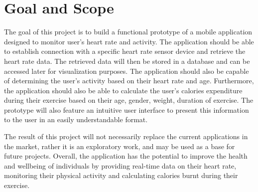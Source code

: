 \section{Goal and Scope}
The goal of this project is to build a functional prototype of a mobile application designed to monitor user's heart rate and activity.
The application should be able to establish connection with a specific heart rate sensor device and retrieve the heart rate data.
The retrieved data will then be stored in a database and can be accessed later for visualization purposes.
The application should also be capable of determining the user's activity based on their heart rate and age.
Furthermore, the application should also be able to calculate the user's calories expenditure during their exercise based on their age, gender, weight, duration of exercise.
The prototype will also feature an intuitive user interface to present this information to the user in an easily understandable format.

The result of this project will not necessarily replace the current applications in the market, rather it is an exploratory work, and may be used as a base for future projects.
Overall, the application has the potential to improve the health and wellbeing of individuals by providing real-time data on their heart rate, monitoring their physical activity and calculating calories burnt during their exercise.

